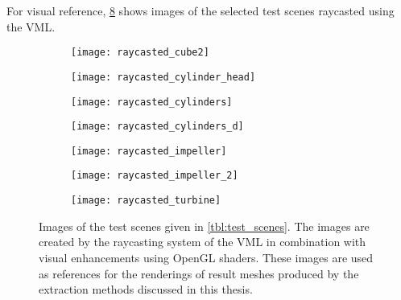 For visual reference, \cref{fig:raycasted_scenes} shows images of the selected test scenes raycasted using the VML.
%
\begin{figure}[!]
	\centering
	\begin{subfigure}[b]{0.43\textwidth}
		\centering
		\texttt{[image: raycasted\_cube2]}
		\caption{\cubes}
		\label{fig:cube2_raycasted}
	\end{subfigure}
	\begin{subfigure}[b]{0.43\textwidth}
		\centering
		\texttt{[image: raycasted\_cylinder\_head]}
		\caption{\cylinderhead}
		\label{fig:cylinder_head_raycasted}
	\end{subfigure}
	\begin{subfigure}[b]{0.43\textwidth}
		\centering
		\texttt{[image: raycasted\_cylinders]}
		\caption{\cylinders}
		\label{fig:cylinders_raycasted}
	\end{subfigure}
	\begin{subfigure}[b]{0.43\textwidth}
		\centering
		\texttt{[image: raycasted\_cylinders\_d]}
		\caption{\cylindersd}
		\label{fig:cylinders_d_raycasted}
	\end{subfigure}
	\begin{subfigure}[b]{0.43\textwidth}
		\centering
		\texttt{[image: raycasted\_impeller]}
		\caption{\impeller}
		\label{fig:impeller_raycasted}
	\end{subfigure}
	\begin{subfigure}[b]{0.43\textwidth}
		\centering
		\texttt{[image: raycasted\_impeller\_2]}
		\caption{\impellerhalf}
		\label{fig:impeller_2_raycasted}
	\end{subfigure}
	\begin{subfigure}[b]{0.43\textwidth}
		\centering
		\texttt{[image: raycasted\_turbine]}
		\caption{\turbine}
		\label{fig:turbine_raycasted}
	\end{subfigure}
	\caption[Raycasted images of test scenes]{
		Images of the test scenes given in \cref{tbl:test_scenes}.
		The images are created by the raycasting system of the VML in combination with visual enhancements using OpenGL shaders.
		These images are used as references for the renderings of result meshes produced by the extraction methods discussed in this thesis.
	}
	\label{fig:raycasted_scenes}
\end{figure}
